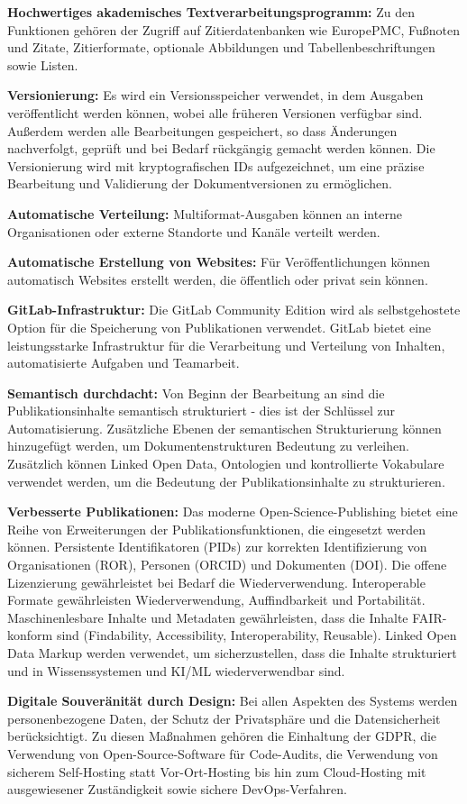 \documentclass{article}
\begin{document}
\textbf{Hochwertiges akademisches Textverarbeitungsprogramm:} Zu den Funktionen gehören der Zugriff auf Zitierdatenbanken wie EuropePMC, Fußnoten und Zitate, Zitierformate, optionale Abbildungen und Tabellenbeschriftungen sowie Listen.


\textbf{Versionierung:} Es wird ein Versionsspeicher verwendet, in dem Ausgaben veröffentlicht werden können, wobei alle früheren Versionen verfügbar sind. Außerdem werden alle Bearbeitungen gespeichert, so dass Änderungen nachverfolgt, geprüft und bei Bedarf rückgängig gemacht werden können. Die Versionierung wird mit kryptografischen IDs aufgezeichnet, um eine präzise Bearbeitung und Validierung der Dokumentversionen zu ermöglichen.


\textbf{Automatische Verteilung:} Multiformat-Ausgaben können an interne Organisationen oder externe Standorte und Kanäle verteilt werden.


\textbf{Automatische Erstellung von Websites:} Für Veröffentlichungen können automatisch Websites erstellt werden, die öffentlich oder privat sein können.


\textbf{GitLab-Infrastruktur:} Die GitLab Community Edition wird als selbstgehostete Option für die Speicherung von Publikationen verwendet. GitLab bietet eine leistungsstarke Infrastruktur für die Verarbeitung und Verteilung von Inhalten, automatisierte Aufgaben und Teamarbeit.


\textbf{Semantisch durchdacht:} Von Beginn der Bearbeitung an sind die Publikationsinhalte semantisch strukturiert - dies ist der Schlüssel zur Automatisierung. Zusätzliche Ebenen der semantischen Strukturierung können hinzugefügt werden, um Dokumentenstrukturen Bedeutung zu verleihen. Zusätzlich können Linked Open Data, Ontologien und kontrollierte Vokabulare verwendet werden, um die Bedeutung der Publikationsinhalte zu strukturieren.


\textbf{Verbesserte Publikationen:} Das moderne Open-Science-Publishing bietet eine Reihe von Erweiterungen der Publikationsfunktionen, die eingesetzt werden können. Persistente Identifikatoren (PIDs) zur korrekten Identifizierung von Organisationen (ROR), Personen (ORCID) und Dokumenten (DOI). Die offene Lizenzierung gewährleistet bei Bedarf die Wiederverwendung. Interoperable Formate gewährleisten Wiederverwendung, Auffindbarkeit und Portabilität. Maschinenlesbare Inhalte und Metadaten gewährleisten, dass die Inhalte FAIR-konform sind (Findability, Accessibility, Interoperability, Reusable). Linked Open Data Markup werden verwendet, um sicherzustellen, dass die Inhalte strukturiert und in Wissenssystemen und KI/ML wiederverwendbar sind.


\textbf{Digitale Souveränität durch Design:} Bei allen Aspekten des Systems werden personenbezogene Daten, der Schutz der Privatsphäre und die Datensicherheit berücksichtigt. Zu diesen Maßnahmen gehören die Einhaltung der GDPR, die Verwendung von Open-Source-Software für Code-Audits, die Verwendung von sicherem Self-Hosting statt Vor-Ort-Hosting bis hin zum Cloud-Hosting mit ausgewiesener Zuständigkeit sowie sichere DevOps-Verfahren.
\end{document}
